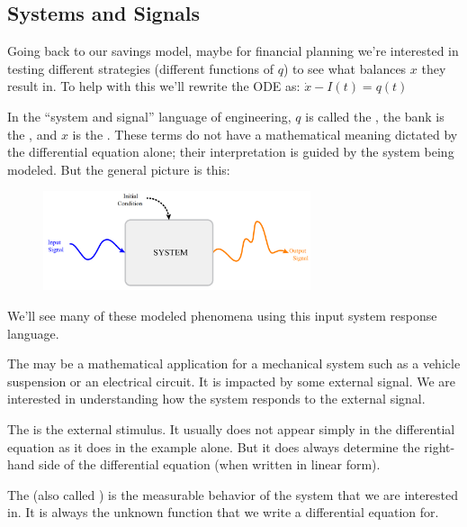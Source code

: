 \documentclass[11pt, openright]{book}
\begin{document}
\newpage

\subsection{Systems and Signals}


Going back to our savings model, maybe for financial planning we're interested in testing different strategies (different functions of $q$) to see what balances $x$ they result in. To help with this we'll rewrite the ODE as: $\dot{x}-I(t)=q(t)$

In the ``system and signal'' language of engineering, $q$ is called the , the bank is the , and $x$ is the . These terms do not have a mathematical meaning dictated by the differential equation alone; their interpretation is guided by the system being modeled. But the general picture is this:

\begin{figure}[ht]
    \centering
    \includegraphics[width=0.7\textwidth]{./documents/l1/System.png}
\end{figure}

We'll see many of these modeled phenomena using this input system response language.

\begin{items}{-10pt}{-10pt}
    \item The  may be a mathematical application for a mechanical system such as a vehicle suspension or an electrical circuit. It is impacted by some external signal. We are interested in understanding how the system responds to the external signal.
    \item The  is the external stimulus. It usually does not appear simply in the differential equation as it does in the example alone. But it does always determine the right-hand side of the differential equation (when written in linear form).
    \item The  (also called ) is the measurable behavior of the system that we are interested in. It is always the unknown function that we write a differential equation for.
\end{items}
\end{document}
